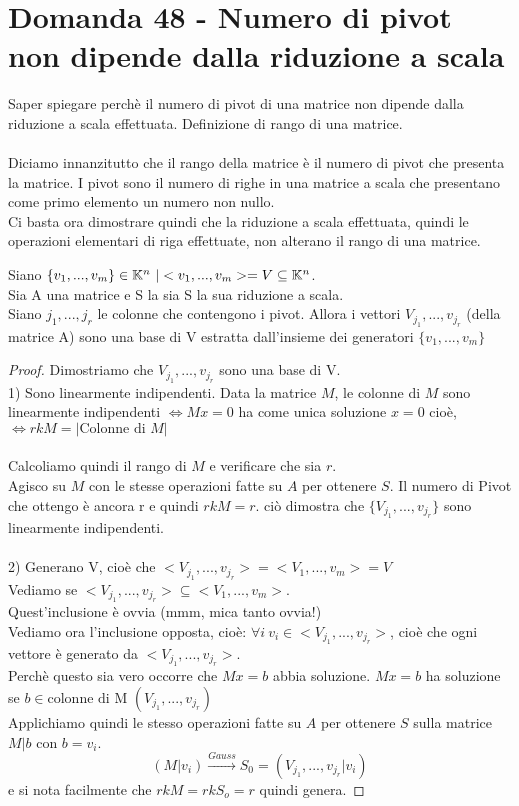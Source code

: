 \documentclass[]{article}
\begin{document}
\section{Domanda 48 - Numero di pivot non dipende dalla riduzione a scala}
Saper spiegare perchè il numero di pivot di una matrice non dipende dalla riduzione a scala effettuata. Definizione di rango di una matrice.\\ \\
Diciamo innanzitutto che il rango della matrice è il numero di pivot che presenta la matrice. I pivot sono il numero di righe in una matrice a scala che presentano come primo elemento un numero non nullo.\\
Ci basta ora dimostrare quindi che la riduzione a scala effettuata, quindi le operazioni elementari di riga effettuate, non alterano il rango di una matrice.
\begin{lem}
Siano $\{v_1, ..., v_m\} \in \mathbb{K}^n\ | <v_1, ..., v_m> = V \subseteq \mathbb{K}^n$.\\
Sia A una matrice e S la sia S la sua riduzione a scala.\\
Siano $j_1, ..., j_r$ le colonne che contengono i pivot. Allora i vettori $V_{j_1},..., v_{j_r}$ (della matrice A) sono una base di V estratta dall'insieme dei generatori   $\{v_1, ..., v_m\}$
\end{lem}
\begin{proof}
Dimostriamo che $V_{j_1},..., v_{j_r}$ sono una base di V.
\\1) Sono linearmente indipendenti.
Data la matrice $M$, le colonne di $M$ sono linearmente indipendenti $\Leftrightarrow Mx = 0$ ha come unica soluzione $x = 0$ cioè, $\Leftrightarrow rkM = |\text{Colonne di }M|$\\ \\
Calcoliamo quindi il rango di $M$ e verificare che sia $r$.\\
Agisco su $M$ con le stesse operazioni fatte su $A$ per ottenere $S$. Il numero di Pivot che ottengo è ancora r e quindi $rkM=r$. ciò dimostra che $\{V_{j_1},..., v_{j_r}\}$ sono linearmente indipendenti.\\ \\
2) Generano V, cioè che $<V_{j_1},..., v_{j_r}> = <V_{1},..., v_{m}> = V$\\
Vediamo se $<V_{j_1},..., v_{j_r}>\subseteq <V_{1},..., v_{m}>$. \\Quest'inclusione è ovvia (mmm, mica tanto ovvia!)\\Vediamo ora l'inclusione opposta, cioè:
$\forall i\ v_i \in <V_{j_1},..., v_{j_r}> $, cioè che ogni vettore è generato da $<V_{j_1},..., v_{j_r}>$. \\
Perchè questo sia vero occorre che $Mx=b$ abbia soluzione. $Mx=b$ ha soluzione se $b \in \text{colonne di M } (V_{j_1},..., v_{j_r})$\\
Applichiamo quindi le stesso operazioni fatte su $A$ per ottenere $S$ sulla matrice $M|b$ con $b=v_i$.
$$(M|v_i) \xrightarrow{Gauss} S_0 = (V_{j_1},..., v_{j_r} | v_i)$$ e si nota facilmente che $rkM = rkS_o = r$ quindi genera.
\end{proof}
\end{document}
